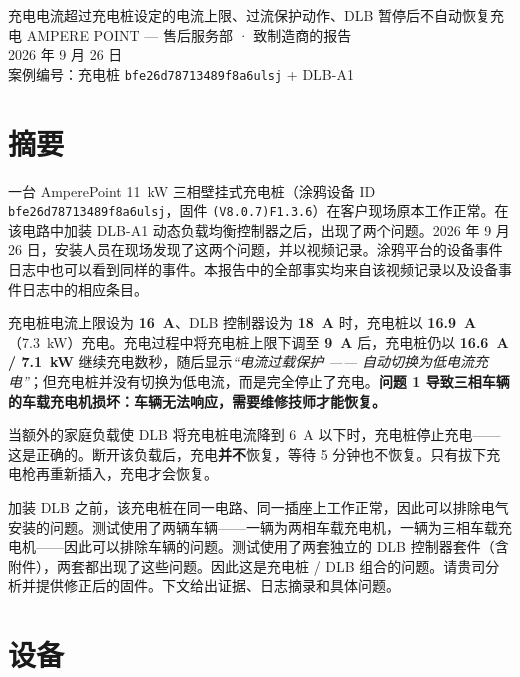 \documentclass[11pt,a4paper]{article}
\begin{document}
%
{充电电流超过充电桩设定的电流上限、过流保护动作、DLB 暂停后不自动恢复充电}%
{AMPERE POINT — 售后服务部 · 致制造商的报告\\2026 年 9 月 26 日\\案例编号：充电桩 \texttt{bfe26d78713489f8a6ulsj} + DLB-A1}

\section{摘要}

一台 AmperePoint 11~kW 三相壁挂式充电桩（涂鸦设备 ID \texttt{bfe26d78713489f8a6ulsj}，固件 \texttt{(V8.0.7)F1.3.6}）在客户现场原本工作正常。在该电路中加装 DLB-A1 动态负载均衡控制器之后，出现了两个问题。2026 年 9 月 26 日，安装人员在现场发现了这两个问题，并以视频记录。涂鸦平台的设备事件日志中也可以看到同样的事件。本报告中的全部事实均来自该视频记录以及设备事件日志中的相应条目。

\begin{apredb}
充电桩电流上限设为 \textbf{16~A}、DLB 控制器设为 \textbf{18~A} 时，充电桩以 \textbf{16.9~A}（7.3~kW）充电。充电过程中将充电桩上限下调至 \textbf{9~A} 后，充电桩仍以 \textbf{16.6~A / 7.1~kW} 继续充电数秒，随后显示\emph{“电流过载保护 —— 自动切换为低电流充电”}；但充电桩并没有切换为低电流，而是完全停止了充电。\textbf{问题 1 导致三相车辆的车载充电机损坏：车辆无法响应，需要维修技师才能恢复。}
\end{apredb}

\begin{apwarnb}
当额外的家庭负载使 DLB 将充电桩电流降到 6~A 以下时，充电桩停止充电——这是正确的。断开该负载后，充电\textbf{并不}恢复，等待 5 分钟也不恢复。只有拔下充电枪再重新插入，充电才会恢复。
\end{apwarnb}

加装 DLB 之前，该充电桩在同一电路、同一插座上工作正常，因此可以排除电气安装的问题。测试使用了两辆车辆——一辆为两相车载充电机，一辆为三相车载充电机——因此可以排除车辆的问题。测试使用了两套独立的 DLB 控制器套件（含附件），两套都出现了这些问题。因此这是充电桩 / DLB 组合的问题。请贵司分析并提供修正后的固件。下文给出证据、日志摘录和具体问题。

\section{设备}
\end{document}
